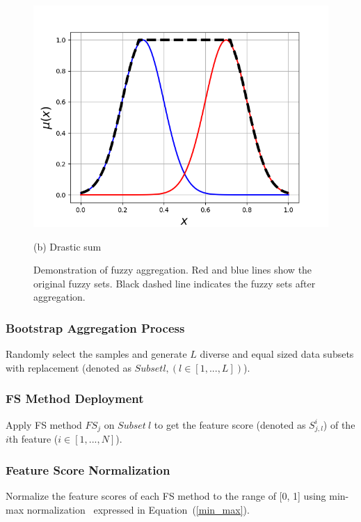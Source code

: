 \documentclass[conference]{IEEEtran}
\begin{document}
\begin{figure}[tb]
	\hspace{1ex}
	\begin{minipage}[t]{0.3\linewidth}
		\centering
		\includegraphics[width=1\textwidth]{Figures/Drastic_sum.png}
		\parbox{4cm}{\small \hspace{5.5cm}(b) Drastic sum}
	\end{minipage}
	\caption{Demonstration of fuzzy aggregation. Red and blue lines show the original fuzzy sets. Black dashed line indicates the fuzzy sets after aggregation.}
	\label{demon_fuzzy_agg}
\end{figure}


\subsubsection{\textbf{Bootstrap Aggregation Process}}
Randomly select the samples and generate $L$ diverse and equal sized data subsets with replacement (denoted as $Subset l, (l \in [1, ..., L])$).

\subsubsection{\textbf{FS Method Deployment}}
Apply FS method $FS_j$ on $Subset \ l$ to get the feature score (denoted as $S^i_{j, l}$) of the $i$th feature ($i \in [1, ..., N]$). 

\subsubsection{\textbf{Feature Score Normalization}}
Normalize the feature scores of each FS method to the range of [0, 1] using min-max normalization~\cite{jain2005score} expressed in Equation~(\ref{min_max}).
\end{document}
